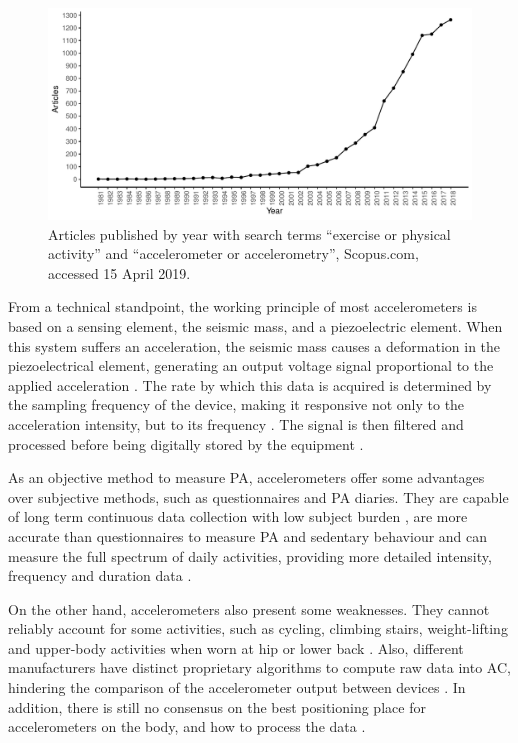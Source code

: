 \documentclass[12pt]{article}
\begin{document}
\renewcommand{\figurename}{Figure}
\begin{figure}[h]
	\includegraphics[width=\linewidth]{figs/fig1.pdf}
	\caption{Articles published by year with search terms ``exercise or physical activity'' and ``accelerometer or accelerometry'', Scopus.com, accessed 15 April 2019.}
	\label{art_year}
\end{figure}

From a technical standpoint, the working principle of most accelerometers is based on a sensing element, the seismic mass, and a piezoelectric element. When this system suffers an acceleration, the seismic mass causes a deformation in the piezoelectrical element, generating an output voltage signal proportional to the applied acceleration . The rate by which this data is acquired is determined by the sampling frequency of the device, making it responsive not only to the acceleration intensity, but to its frequency . The signal is then filtered and processed before being digitally stored by the equipment .

As an objective method to measure PA, accelerometers offer some advantages over subjective methods, such as questionnaires and PA diaries. They are capable of long term continuous data collection with low subject burden , are more accurate than questionnaires to measure PA and sedentary behaviour  and can measure the full spectrum of daily activities, providing more detailed intensity, frequency and duration data .

On the other hand, accelerometers also present some weaknesses. They cannot reliably account for some activities, such as cycling, climbing stairs, weight-lifting and upper-body activities when worn at hip or lower back . Also, different manufacturers have distinct proprietary algorithms to compute raw data into AC, hindering the comparison of the accelerometer output between devices . In addition, there is still no consensus on the best positioning place for accelerometers on the body, and how to process the data .
\end{document}
